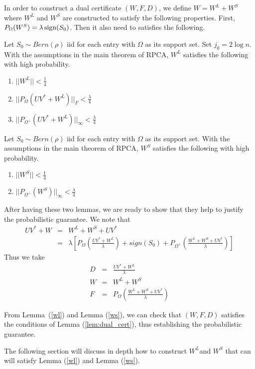 In order to construct a dual certificate $(W, F, D)$, we define $W = W^{L}+W^{S}$ where $W^{L}$ and $W^{S}$ are constructed to satisfy the following
properties. First, $P_{\Omega}(W^{S}) = \lambda \operatorname{sign}(S_0)$. Then it also need to satisfies the following.

\begin{lemma} \label{wl} Let $S_0\sim Bern(\rho)$ iid for each entry with $\Omega$
as its support set. Set $j_{0}=2\log n$. With the assumptions in
the main theorem of RPCA, $W^{L}$ satisfies the following with high
probability.
\begin{enumerate}
\item $||W^{L}||<\frac{1}{4}$
\item $||P_{\Omega}(UV^{*}+W^{L})||_{F}<\frac{\lambda}{4}$
\item $||P_{\Omega^{\bot}}(UV^{*}+W^{L})||_{\infty}<\frac{\lambda}{4}$
\end{enumerate}
\end{lemma}

\begin{lemma} \label{ws} Let $S_0\sim Bern(\rho)$ iid for each entry with $\Omega$
as its support set. With the assumptions in the main theorem of RPCA,
$W^{S}$ satisfies the following with high probability.
\begin{enumerate}
\item $||W^{S}||<\frac{1}{4}$
\item $||P_{\Omega^{\bot}}(W^{S})||_{\infty}<\frac{\lambda}{4}$
\end{enumerate}
\end{lemma}

After having these two lemmas, we are ready to show that they help to justify the probabilistic guarantee. We note that
\begin{eqnarray*}
UV^{*}+W & = & W^{L}+W^{S}+UV^{*}\\
 & = & \lambda \left[ P_{\Omega} \left( \frac{UV^{*}+W^{L}}{\lambda} \right) + sign(S_{0}) + P_{\Omega^{\bot}} \left( \frac{W^{L}+W^{S}+UV^{*}}{\lambda} \right) \right]
\end{eqnarray*}
Thus we take
\begin{eqnarray*}
D & = & \frac{UV^{*}+W^{L}}{\lambda}\\
W & = & W^{L}+W^{S}\\
F & = & P_{\Omega} \left( \frac{W^{L}+W^{S}+UV^{*}}{\lambda} \right)
\end{eqnarray*}


From Lemma~(\ref{wl}) and Lemma (\ref{ws}), we can check that $(W,F,D)$
satisfies the conditions of Lemma (\ref{lem:dual_cert}), thus establishing the probabilistic
guarantee.

The following section will discuss in depth how to construct $W^{L}$and $W^{S}$ that can
will satisfy   Lemma (\ref{wl}) and Lemma (\ref{ws}). 